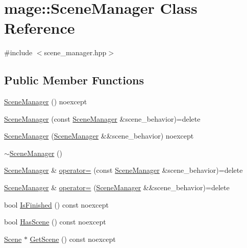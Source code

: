 \hypertarget{classmage_1_1_scene_manager}{}\section{mage\+:\+:Scene\+Manager Class Reference}
\label{classmage_1_1_scene_manager}


{\ttfamily \#include $<$scene\+\_\+manager.\+hpp$>$}

\subsection*{Public Member Functions}
\begin{DoxyCompactItemize}
\item 
\hyperlink{classmage_1_1_scene_manager_aa505da85a4d49ea4b2fcda16559f5700}{Scene\+Manager} () noexcept
\item 
\hyperlink{classmage_1_1_scene_manager_a450ce8e4d52483a2dcc3bb090f565373}{Scene\+Manager} (const \hyperlink{classmage_1_1_scene_manager}{Scene\+Manager} \&scene\+\_\+behavior)=delete
\item 
\hyperlink{classmage_1_1_scene_manager_a651c58791268cf29d33c18031e4c1f41}{Scene\+Manager} (\hyperlink{classmage_1_1_scene_manager}{Scene\+Manager} \&\&scene\+\_\+behavior) noexcept
\item 
\hyperlink{classmage_1_1_scene_manager_a849386b052d6ae8945c9554f888e1707}{$\sim$\+Scene\+Manager} ()
\item 
\hyperlink{classmage_1_1_scene_manager}{Scene\+Manager} \& \hyperlink{classmage_1_1_scene_manager_a90c17a35f737879fa07acb28f6d787af}{operator=} (const \hyperlink{classmage_1_1_scene_manager}{Scene\+Manager} \&scene\+\_\+behavior)=delete
\item 
\hyperlink{classmage_1_1_scene_manager}{Scene\+Manager} \& \hyperlink{classmage_1_1_scene_manager_a5f2e494edeb329e54a928a1bc0f5f7df}{operator=} (\hyperlink{classmage_1_1_scene_manager}{Scene\+Manager} \&\&scene\+\_\+behavior)=delete
\item 
bool \hyperlink{classmage_1_1_scene_manager_adeb1fd1d9f40229ccb0ef8adfb55f4cc}{Is\+Finished} () const noexcept
\item 
bool \hyperlink{classmage_1_1_scene_manager_ac767593112ea1d8b47cc79283cf7c47e}{Has\+Scene} () const noexcept
\item 
\hyperlink{classmage_1_1_scene}{Scene} $\ast$ \hyperlink{classmage_1_1_scene_manager_a55d720c9f90cfc46dbf07d46537072c1}{Get\+Scene} () const noexcept
\item 

\end{DoxyCompactItemize}
